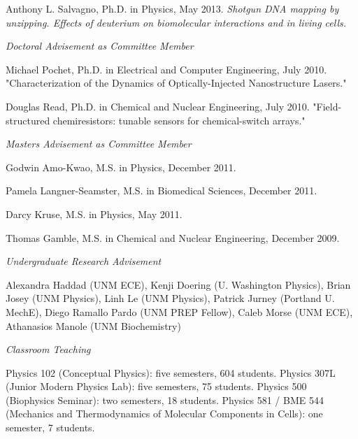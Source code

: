 \documentclass[11pt]{article}
\begin{document}
\ind Anthony L. Salvagno, Ph.D. in Physics, May 2013. \emph{Shotgun DNA mapping by unzipping. Effects of deuterium on biomolecular interactions and in living cells.}       

\medskip
\noindent\emph{Doctoral Advisement as Committee Member \vspace{0.01in}}

\ind Michael Pochet, Ph.D. in Electrical and Computer Engineering, July 2010. "Characterization of the Dynamics of Optically-Injected Nanostructure Lasers."

\ind Douglas Read, Ph.D. in Chemical and Nuclear Engineering, July 2010. "Field-structured chemiresistors: tunable sensors for chemical-switch arrays."

\medskip

\noindent\emph{Masters Advisement as Committee Member \vspace{0.01in}}

\ind Godwin Amo-Kwao, M.S. in Physics, December 2011.

\ind Pamela Langner-Seamster, M.S. in Biomedical Sciences, December 2011.

\ind Darcy Kruse, M.S. in Physics, May 2011.

\ind Thomas Gamble, M.S. in Chemical and Nuclear Engineering, December 2009.

\medskip

\noindent\emph{Undergraduate Research Advisement \vspace{0.01in}}

\ind Alexandra Haddad (UNM ECE), Kenji Doering (U. Washington Physics), Brian Josey (UNM Physics), Linh Le (UNM Physics), Patrick Jurney (Portland U. MechE), Diego Ramallo Pardo (UNM PREP Fellow), Caleb Morse (UNM ECE), Athanasios Manole (UNM Biochemistry)

\medskip

\noindent\emph{Classroom Teaching \vspace{0.01in}}

\ind Physics 102 (Conceptual Physics): five semesters, 604 students. Physics 307L (Junior Modern Physics Lab): five semesters, 75 students. Physics 500 (Biophysics Seminar): two semesters, 18 students. Physics 581 / BME 544 (Mechanics and Thermodynamics of Molecular Components in Cells): one semester, 7 students.

\bigskip

\medskip
\end{document}
